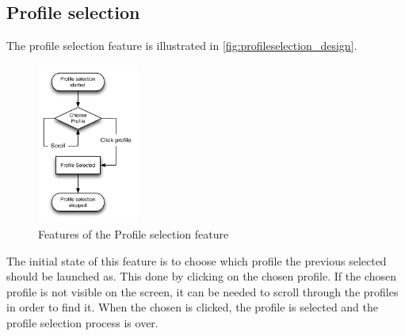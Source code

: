 \subsection{Profile selection}
The profile selection feature is illustrated in \autoref{fig:profileselection_design}. 
\label{design:profile_selection}
\begin{figure}[h]
	\centering
	\includegraphics[width=0.3\textwidth]{gfx/profileselect_design.pdf}
	\caption{Features of the Profile selection feature}
	\label{fig:profileselection_design}
\end{figure}
The initial state of this feature is to choose which profile the previous selected should be launched as. This done by clicking on the chosen profile. If the chosen profile is not visible on the screen, it can be needed to scroll through the profiles in order to find it. When the chosen is clicked, the profile is selected and the profile selection process is over.